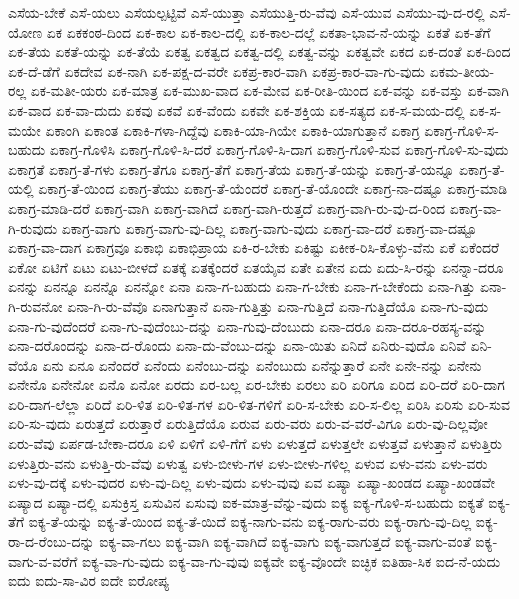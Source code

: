 {ಎಸೆಯ-ಬೇಕೆ
ಎಸೆ-ಯಲು
ಎಸೆಯಲ್ಪಟ್ಟಿವೆ
ಎಸೆ-ಯುತ್ತಾ
ಎಸೆಯುತ್ತಿ-ರು-ವೆವು
ಎಸೆ-ಯುವ
ಎಸೆಯು-ವು-ದ-ರಲ್ಲಿ
ಎಸೆ-ಯೋಣ
ಏಕ
ಏಕಕಂಠ-ದಿಂದ
ಏಕ-ಕಾಲ
ಏಕ-ಕಾಲ-ದಲ್ಲಿ
ಏಕ-ಕಾಲ-ದಲ್ಲೆ
ಏಕತಾ-ಭಾವ-ನೆ-ಯನ್ನು
ಏಕತೆ
ಏಕ-ತೆಗೆ
ಏಕ-ತೆಯ
ಏಕತೆ-ಯನ್ನು
ಏಕ-ತೆಯೆ
ಏಕತ್ವ
ಏಕತ್ವದ
ಏಕತ್ವ-ದಲ್ಲಿ
ಏಕತ್ವ-ವನ್ನು
ಏಕತ್ವವೇ
ಏಕದ
ಏಕ-ದಂತೆ
ಏಕ-ದಿಂದ
ಏಕ-ದೆ-ಡೆಗೆ
ಏಕದೇವ
ಏಕ-ನಾಗಿ
ಏಕ-ಪಕ್ಷ-ದ-ವರೇ
ಏಕಪ್ರ-ಕಾರ-ವಾಗಿ
ಏಕಪ್ರ-ಕಾರ-ವಾ-ಗು-ವುದು
ಏಕಮ-ತೀಯ-ರಲ್ಲ
ಏಕ-ಮತೀ-ಯರು
ಏಕ-ಮಾತ್ರ
ಏಕ-ಮುಖ-ವಾದ
ಏಕ-ಮೇವ
ಏಕ-ರೀತಿ-ಯಿಂದ
ಏಕ-ವನ್ನು
ಏಕ-ವಸ್ತು
ಏಕ-ವಾಗಿ
ಏಕ-ವಾದ
ಏಕ-ವಾ-ದುದು
ಏಕವು
ಏಕವೆ
ಏಕ-ವೆಂದು
ಏಕವೇ
ಏಕ-ಶಕ್ತಿಯ
ಏಕ-ಸತ್ಯದ
ಏಕ-ಸ-ಮಯ-ದಲ್ಲಿ
ಏಕ-ಸ-ಮಯೇ
ಏಕಾಂಗಿ
ಏಕಾಂತ
ಏಕಾಕಿ-ಗಳಾ-ಗಿದ್ದೆವು
ಏಕಾಕಿ-ಯಾ-ಗಿಯೇ
ಏಕಾಕಿ-ಯಾಗುತ್ತಾನೆ
ಏಕಾಗ್ರ
ಏಕಾಗ್ರ-ಗೊಳಿ-ಸ-ಬಹುದು
ಏಕಾಗ್ರ-ಗೊಳಿಸಿ
ಏಕಾಗ್ರ-ಗೊಳಿ-ಸಿ-ದರೆ
ಏಕಾಗ್ರ-ಗೊಳಿ-ಸಿ-ದಾಗ
ಏಕಾಗ್ರ-ಗೊಳಿ-ಸುವ
ಏಕಾಗ್ರ-ಗೊಳಿ-ಸು-ವುದು
ಏಕಾಗ್ರತೆ
ಏಕಾಗ್ರ-ತೆ-ಗಳು
ಏಕಾಗ್ರ-ತೆಗೂ
ಏಕಾಗ್ರ-ತೆಗೆ
ಏಕಾಗ್ರ-ತೆಯ
ಏಕಾಗ್ರ-ತೆ-ಯನ್ನು
ಏಕಾಗ್ರ-ತೆ-ಯನ್ನೂ
ಏಕಾಗ್ರ-ತೆ-ಯಲ್ಲಿ
ಏಕಾಗ್ರ-ತೆ-ಯಿಂದ
ಏಕಾಗ್ರ-ತೆಯು
ಏಕಾಗ್ರ-ತೆ-ಯೆಂದರೆ
ಏಕಾಗ್ರ-ತೆ-ಯೊಂದೇ
ಏಕಾಗ್ರ-ನಾ-ದಷ್ಟೂ
ಏಕಾಗ್ರ-ಮಾಡಿ
ಏಕಾಗ್ರ-ಮಾಡಿ-ದರೆ
ಏಕಾಗ್ರ-ವಾಗಿ
ಏಕಾಗ್ರ-ವಾಗಿದೆ
ಏಕಾಗ್ರ-ವಾಗಿ-ರುತ್ತದೆ
ಏಕಾಗ್ರ-ವಾಗಿ-ರು-ವು-ದ-ರಿಂದ
ಏಕಾಗ್ರ-ವಾ-ಗಿ-ರುವುದು
ಏಕಾಗ್ರ-ವಾಗು
ಏಕಾಗ್ರ-ವಾಗು-ವು-ದಿಲ್ಲ
ಏಕಾಗ್ರ-ವಾಗು-ವುದು
ಏಕಾಗ್ರ-ವಾ-ದರೆ
ಏಕಾಗ್ರ-ವಾ-ದಷ್ಟೂ
ಏಕಾಗ್ರ-ವಾ-ದಾಗ
ಏಕಾಗ್ರವೂ
ಏಕಾಭಿ
ಏಕಾಭಿಪ್ರಾಯ
ಏಕಿ-ರ-ಬೇಕು
ಏಕಿಷ್ಟು
ಏಕೀಕ-ರಿಸಿ-ಕೊಳ್ಳು-ವೆನು
ಏಕೆ
ಏಕೆಂದರೆ
ಏಕೋ
ಏಟಿಗೆ
ಏಟು
ಏಟು-ಬೀಳದೆ
ಏತಕ್ಕೆ
ಏತಕ್ಕೆಂದರೆ
ಏತಯೈವ
ಏತೇ
ಏತೇನ
ಏದು
ಏದು-ಸಿ-ರನ್ನು
ಏನನ್ನಾ-ದರೂ
ಏನನ್ನು
ಏನನ್ನೂ
ಏನನ್ನೊ
ಏನನ್ನೋ
ಏನಾ
ಏನಾ-ಗ-ಬಹುದು
ಏನಾ-ಗ-ಬೇಕು
ಏನಾ-ಗ-ಬೇಕೆಂದು
ಏನಾ-ಗಿತ್ತು
ಏನಾ-ಗಿ-ರುವನೋ
ಏನಾ-ಗಿ-ರು-ವೆವೊ
ಏನಾಗುತ್ತಾನೆ
ಏನಾ-ಗುತ್ತಿತ್ತು
ಏನಾ-ಗುತ್ತಿದೆ
ಏನಾ-ಗುತ್ತಿದೆಯೊ
ಏನಾ-ಗು-ವುದು
ಏನಾ-ಗು-ವುದೆಂದರೆ
ಏನಾ-ಗು-ವುದೆಂಬು-ದನ್ನು
ಏನಾ-ಗುವು-ದೆಂಬುದು
ಏನಾ-ದರೂ
ಏನಾ-ದರೂ-ರಹಸ್ಯ-ವನ್ನು
ಏನಾ-ದರೊಂದನ್ನು
ಏನಾ-ದ-ರೊಂದು
ಏನಾ-ದು-ವೆಂಬು-ದನ್ನು
ಏನಾ-ಯಿತು
ಏನಿದೆ
ಏನಿರು-ವುದೊ
ಏನಿವೆ
ಏನಿ-ವೆಯೊ
ಏನು
ಏನೂ
ಏನೆಂದರೆ
ಏನೆಂದು
ಏನೆಂಬು-ದನ್ನು
ಏನೆಂಬುದು
ಏನೆನ್ನುತ್ತಾರೆ
ಏನೇ
ಏನೇ-ನನ್ನು
ಏನೇನು
ಏನೇನೊ
ಏನೇನೋ
ಏನೊ
ಏನೋ
ಏರದು
ಏರ-ಬಲ್ಲ
ಏರ-ಬೇಕು
ಏರಲು
ಏರಿ
ಏರಿಗೂ
ಏರಿದ
ಏರಿ-ದರೆ
ಏರಿ-ದಾಗ
ಏರಿ-ದಾಗ-ಲೆಲ್ಲಾ
ಏರಿದೆ
ಏರಿ-ಳಿತ
ಏರಿ-ಳಿತ-ಗಳ
ಏರಿ-ಳಿತ-ಗಳಿಗೆ
ಏರಿ-ಸ-ಬೇಕು
ಏರಿ-ಸ-ಲಿಲ್ಲ
ಏರಿಸಿ
ಏರಿಸು
ಏರಿ-ಸುವ
ಏರಿ-ಸು-ವುದು
ಏರುತ್ತದೆ
ಏರುತ್ತಾರೆ
ಏರುತ್ತಿದೆಯೊ
ಏರುವ
ಏರು-ವರು
ಏರು-ವ-ವರೆ-ವಿಗೂ
ಏರು-ವು-ದಿಲ್ಲವೋ
ಏರು-ವೆವು
ಏರ್ಪಡ-ಬೇಕಾ-ದರೂ
ಏಳಿ
ಏಳಿಗೆ
ಏಳಿ-ಗೆಗೆ
ಏಳು
ಏಳುತ್ತದೆ
ಏಳುತ್ತಲೇ
ಏಳುತ್ತವೆ
ಏಳುತ್ತಾನೆ
ಏಳುತ್ತಿರು
ಏಳುತ್ತಿರು-ವನು
ಏಳುತ್ತಿ-ರು-ವೆವು
ಏಳುತ್ವ
ಏಳು-ಬೀಳು-ಗಳ
ಏಳು-ಬೀಳು-ಗಳಿಲ್ಲ
ಏಳುವ
ಏಳು-ವನು
ಏಳು-ವರು
ಏಳು-ವು-ದಕ್ಕೆ
ಏಳು-ವುದರ
ಏಳು-ವು-ದಿಲ್ಲ
ಏಳು-ವುದು
ಏಳು-ವುವು
ಏವ
ಏಷ್ಯಾ
ಏಷ್ಯಾ-ಖಂಡದ
ಏಷ್ಯಾ-ಖಂಡವೇ
ಏಷ್ಯಾದ
ಏಷ್ಯಾ-ದಲ್ಲಿ
ಏಸುಕ್ರಿಸ್ತ
ಏಸುವಿನ
ಏಸುವು
ಐಕ-ಮಾತ್ರ-ವೆನ್ನು-ವುದು
ಐಕ್ಯ
ಐಕ್ಯ-ಗೊಳಿ-ಸ-ಬಹುದು
ಐಕ್ಯತೆ
ಐಕ್ಯ-ತೆಗೆ
ಐಕ್ಯ-ತೆ-ಯನ್ನು
ಐಕ್ಯ-ತೆ-ಯಿಂದ
ಐಕ್ಯ-ತೆ-ಯಿದೆ
ಐಕ್ಯ-ನಾಗು-ವನು
ಐಕ್ಯ-ರಾಗು-ವರು
ಐಕ್ಯ-ರಾಗು-ವು-ದಿಲ್ಲ
ಐಕ್ಯ-ರಾ-ದ-ರೆಂಬು-ದನ್ನು
ಐಕ್ಯ-ವಾ-ಗಲು
ಐಕ್ಯ-ವಾಗಿ
ಐಕ್ಯ-ವಾಗಿದೆ
ಐಕ್ಯ-ವಾಗು
ಐಕ್ಯ-ವಾಗುತ್ತದೆ
ಐಕ್ಯ-ವಾಗು-ವಂತೆ
ಐಕ್ಯ-ವಾಗು-ವ-ವರೆಗೆ
ಐಕ್ಯ-ವಾ-ಗು-ವುದು
ಐಕ್ಯ-ವಾ-ಗು-ವುವು
ಐಕ್ಯವೇ
ಐಕ್ಯ-ವೊಂದೇ
ಐಚ್ಛಿಕ
ಐತಿಹಾ-ಸಿಕ
ಐದ-ನೆ-ಯದು
ಐದು
ಐದು-ಸಾ-ವಿರ
ಐದೇ
ಐರೋಪ್ಯ
}
